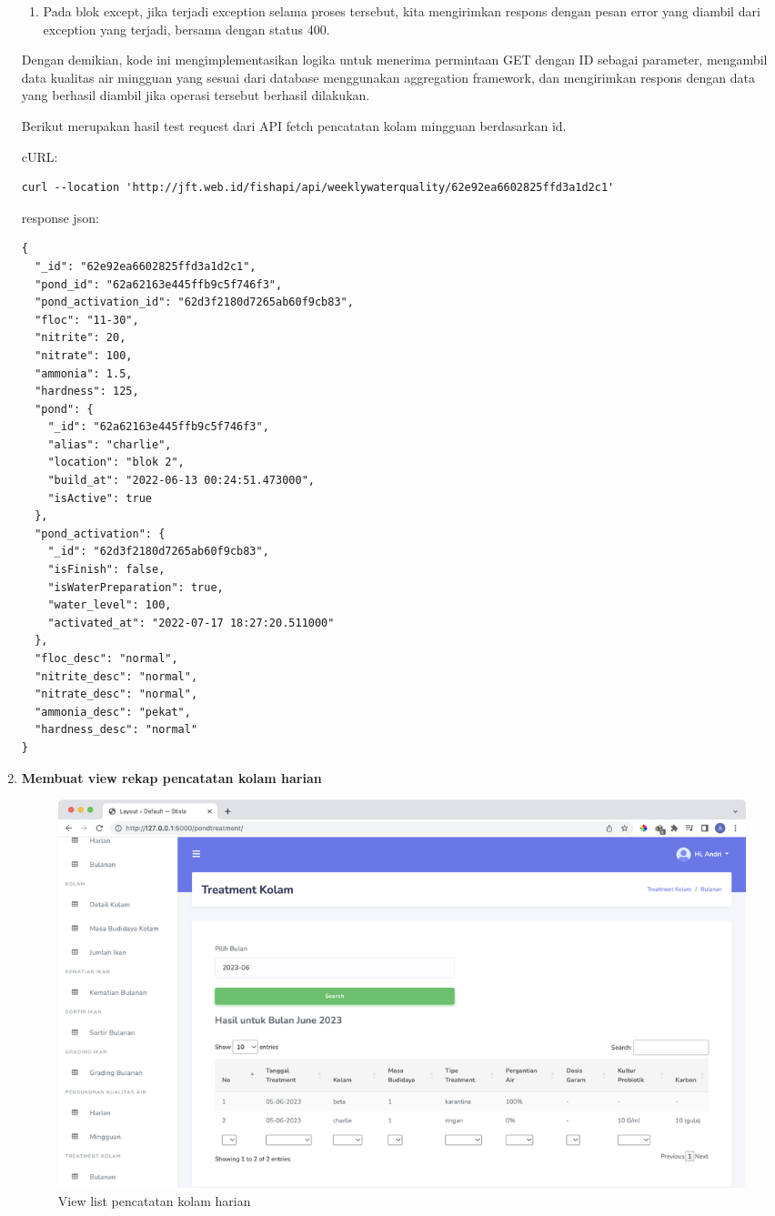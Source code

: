 \begin{enumerate}[1.]
\begin{enumerate}
\item Pada blok except, jika terjadi exception selama proses tersebut, kita mengirimkan respons dengan pesan error yang diambil dari exception yang terjadi, bersama dengan status 400.

\end{enumerate}

Dengan demikian, kode ini mengimplementasikan logika untuk menerima permintaan GET dengan ID sebagai parameter, mengambil data kualitas air mingguan yang sesuai dari database menggunakan aggregation framework, dan mengirimkan respons dengan data yang berhasil diambil jika operasi tersebut berhasil dilakukan.


Berikut merupakan hasil test request dari API fetch pencatatan kolam mingguan berdasarkan id.

cURL:

\begin{lstlisting}
curl --location 'http://jft.web.id/fishapi/api/weeklywaterquality/62e92ea6602825ffd3a1d2c1'
\end{lstlisting}

response json:

\begin{lstlisting}
{
  "_id": "62e92ea6602825ffd3a1d2c1",
  "pond_id": "62a62163e445ffb9c5f746f3",
  "pond_activation_id": "62d3f2180d7265ab60f9cb83",
  "floc": "11-30",
  "nitrite": 20,
  "nitrate": 100,
  "ammonia": 1.5,
  "hardness": 125,
  "pond": {
    "_id": "62a62163e445ffb9c5f746f3",
    "alias": "charlie",
    "location": "blok 2",
    "build_at": "2022-06-13 00:24:51.473000",
    "isActive": true
  },
  "pond_activation": {
    "_id": "62d3f2180d7265ab60f9cb83",
    "isFinish": false,
    "isWaterPreparation": true,
    "water_level": 100,
    "activated_at": "2022-07-17 18:27:20.511000"
  },
  "floc_desc": "normal",
  "nitrite_desc": "normal",
  "nitrate_desc": "normal",
  "ammonia_desc": "pekat",
  "hardness_desc": "normal"
}
\end{lstlisting}

\item \textbf{Membuat view rekap pencatatan kolam harian}
\begin{figure}[H]
	\centering
	\includegraphics[width=1\textwidth]{gambar/Sprint10/view/view_rekap_treatment_kolam}
	\caption{View list pencatatan kolam harian}
	\label{fig:view_list_pencatatan_kolam_harian}
\end{figure}


\end{enumerate}
